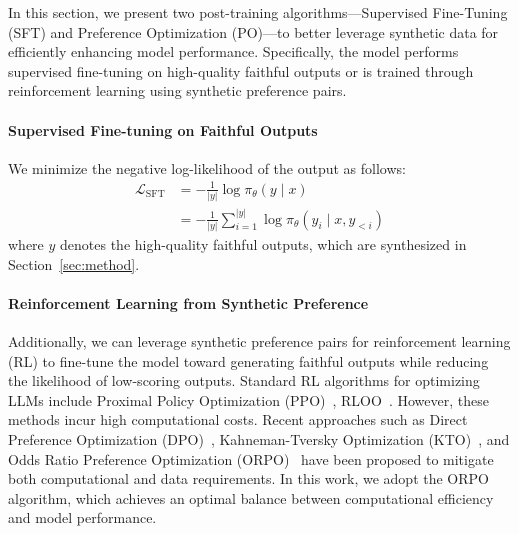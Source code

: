 In this section, we present two post-training algorithms—Supervised Fine-Tuning (SFT) and Preference Optimization (PO)—to better leverage synthetic data for efficiently enhancing model performance. Specifically, the model performs supervised fine-tuning on high-quality faithful outputs or is trained through reinforcement learning using synthetic preference pairs.

\paragraph{Supervised Fine-tuning on Faithful Outputs}
We minimize the negative log-likelihood of the output as follows:
\begin{equation}
\begin{aligned}    
    \mathcal{L}_{\text{SFT}}
    &= -\frac{1}{|y|} \log \pi_{\theta}(y \;\vert\; x) \\
    &= -\frac{1}{|y|} \sum_{i=1}^{|y|} \log \pi_{\theta}(y_i \;\vert\; x,y_{<i})
\end{aligned}
\end{equation}
where $y$ denotes the high-quality faithful outputs, which are synthesized in Section~\ref{sec:method}.

\paragraph{Reinforcement Learning from Synthetic Preference}

Additionally, we can leverage synthetic preference pairs for reinforcement learning (RL) to fine-tune the model toward generating faithful outputs while reducing the likelihood of low-scoring outputs. Standard RL algorithms for optimizing LLMs include Proximal Policy Optimization (PPO)~\cite{ppo}, RLOO~\cite{RLOO}. However, these methods incur high computational costs. Recent approaches such as Direct Preference Optimization (DPO)~\cite{dpo}, Kahneman-Tversky Optimization (KTO)~\cite{kto}, and Odds Ratio Preference Optimization (ORPO)~\cite{orpo} have been proposed to mitigate both computational and data requirements. In this work, we adopt the ORPO algorithm, which achieves an optimal balance between computational efficiency and model performance.


